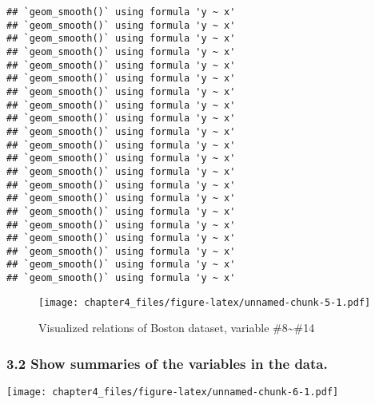 \documentclass[
]{article}
\newenvironment{Shaded}{\begin{snugshade}}{\end{snugshade}}
\newcommand{\CommentTok}[1]{\textcolor[rgb]{0.56,0.35,0.01}{\textit{#1}}}
\newcommand{\FunctionTok}[1]{\textcolor[rgb]{0.00,0.00,0.00}{#1}}
\newcommand{\NormalTok}[1]{#1}
\newcommand{\SpecialCharTok}[1]{\textcolor[rgb]{0.00,0.00,0.00}{#1}}
\begin{document}
\begin{verbatim}
## `geom_smooth()` using formula 'y ~ x'
## `geom_smooth()` using formula 'y ~ x'
## `geom_smooth()` using formula 'y ~ x'
## `geom_smooth()` using formula 'y ~ x'
## `geom_smooth()` using formula 'y ~ x'
## `geom_smooth()` using formula 'y ~ x'
## `geom_smooth()` using formula 'y ~ x'
## `geom_smooth()` using formula 'y ~ x'
## `geom_smooth()` using formula 'y ~ x'
## `geom_smooth()` using formula 'y ~ x'
## `geom_smooth()` using formula 'y ~ x'
## `geom_smooth()` using formula 'y ~ x'
## `geom_smooth()` using formula 'y ~ x'
## `geom_smooth()` using formula 'y ~ x'
## `geom_smooth()` using formula 'y ~ x'
## `geom_smooth()` using formula 'y ~ x'
## `geom_smooth()` using formula 'y ~ x'
## `geom_smooth()` using formula 'y ~ x'
## `geom_smooth()` using formula 'y ~ x'
## `geom_smooth()` using formula 'y ~ x'
## `geom_smooth()` using formula 'y ~ x'
\end{verbatim}

\begin{figure}
\centering
\texttt{[image: chapter4\_files/figure-latex/unnamed-chunk-5-1.pdf]}
\caption{Visualized relations of Boston dataset, variable
\#8\textasciitilde\#14}
\end{figure}

\hypertarget{show-summaries-of-the-variables-in-the-data.}{%
\subsubsection{3.2 Show summaries of the variables in the
data.}\label{show-summaries-of-the-variables-in-the-data.}}

\begin{Shaded}
\end{Shaded}

\texttt{[image: chapter4\_files/figure-latex/unnamed-chunk-6-1.pdf]}

\begin{Shaded}
\end{Shaded}
\end{document}
